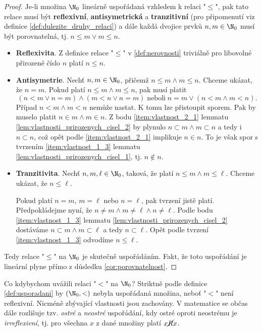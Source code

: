 \begin{proof}
    Je-li množina $\N_0$ lineárně uspořádaná vzhledem k relaci "$\leq$", pak tato relace musí být \textbf{reflexivní}, \textbf{antisymetrická} a \textbf{tranzitivní} (pro připomenutí viz definice \ref{def:dulezite_druhy_relaci}) a dále každá dvojice prvků $n,m\in\N_0$ musí být porovnatelná, tj. $n\leq m\lor m\leq n$.
    \begin{itemize}
        \item \textbf{Reflexivita}. Z definice relace "$\leq$" v \ref{def:nerovnosti} triviálně pro libovolné přirozené číslo $n$ platí $n\leq n$.
        \item \textbf{Antisymetrie}. Nechť $n,m\in\N_0$, přičemž $n\leq m \land m\leq n$. Chceme ukázat, že $n=m$. Pokud platí $n\leq m \land m\leq n$, pak musí platit
        \begin{equation*}
            (n<m\lor n=m) \land (m<n\lor n=m)\;\text{neboli}\;n=m\lor (n<m\land m<n).
        \end{equation*}
        Případ $n<m\land m<n$ nemůže nastat. K tomu lze přistoupit sporem. Pak by muselo platit $n\in m\land m\in n$. Z bodu \ref{item:vlastnost_2_1} lemmatu \ref{lem:vlastnosti_prirozenych_cisel_2} by plynulo $n\subset m\land m\subset n$ a tedy i $n\subset n$, což opět podle \ref{item:vlastnost_2_1} implikuje $n\in n$. To je však spor s tvrzením \ref{item:vlastnost_1_3} lemmatu \ref{lem:vlastnosti_prirozenych_cisel_1}, tj. $n\notin n$.
        \item \textbf{Tranzitivita}. Nechť $n,m,\ell\in\N_0$, taková, že platí $n\leq m \land m\leq\ell$. Chceme ukázat, že $n\leq\ell$.\par
        Pokud platí $n=m$, $m=\ell$ nebo $n=\ell$, pak tvrzení jistě platí. Předpokládejme nyní, že $n\neq m\land m\neq\ell\land n\neq\ell$. Podle bodu \ref{item:vlastnost_1_3} lemmatu \ref{lem:vlastnosti_prirozenych_cisel_2} dostáváme $n\subset m\land m\subset\ell$ a tedy $n\subset\ell$. Opět podle tvrzení \ref{item:vlastnost_1_3} odvodíme $n\leq\ell$.
    \end{itemize}
    Tedy relace "$\leq$" na $\N_0$ je skutečně uspořádáním. Fakt, že toto uspořádání je lineární plyne přímo z důsledku \ref{cor:porovnatelnost}.
\end{proof}
Co kdybychom uvážili relaci "$<$" na $\N_0$? Striktně podle definice \ref{def:usporadani} by $(\N_0,<)$ nebyla uspořádaná množina, neboť "$<$" není reflexivní. Nicméně zbývající vlastnosti jsou zachovány. V matematice se občas dále rozlišuje tzv. \emph{ostré} a \emph{neostré} uspořádání, kdy ostré oproti neostrému je \emph{irreflexivní}, tj. pro všechna $x$ z dané množiny platí $x\cancel{R}x$.